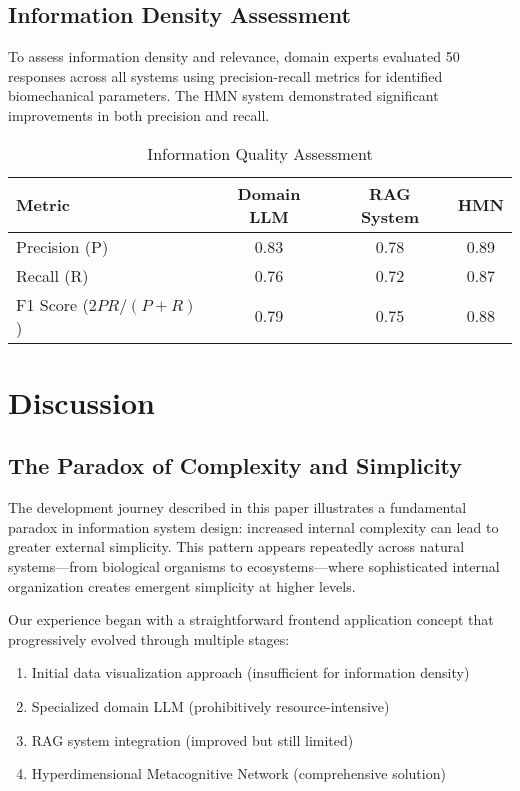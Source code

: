 \documentclass[journal,onecolumn]{IEEEtran}
\begin{document}
\subsection{Information Density Assessment}

To assess information density and relevance, domain experts evaluated 50 responses across all systems using precision-recall metrics for identified biomechanical parameters. The HMN system demonstrated significant improvements in both precision and recall.

\begin{table}[ht]
\centering
\caption{Information Quality Assessment}
\label{tab:info-quality}
\begin{tabular}{lccc}
\toprule
\textbf{Metric} & \textbf{Domain LLM} & \textbf{RAG System} & \textbf{HMN} \\
\midrule
Precision (P) & 0.83 & 0.78 & 0.89 \\
Recall (R) & 0.76 & 0.72 & 0.87 \\
F1 Score ($2PR/(P+R)$) & 0.79 & 0.75 & 0.88 \\
\bottomrule
\end{tabular}
\end{table}

\section{Discussion}

\subsection{The Paradox of Complexity and Simplicity}

The development journey described in this paper illustrates a fundamental paradox in information system design: increased internal complexity can lead to greater external simplicity. This pattern appears repeatedly across natural systems—from biological organisms to ecosystems—where sophisticated internal organization creates emergent simplicity at higher levels.

Our experience began with a straightforward frontend application concept that progressively evolved through multiple stages:

\begin{enumerate}
\item Initial data visualization approach (insufficient for information density)
\item Specialized domain LLM (prohibitively resource-intensive)
\item RAG system integration (improved but still limited)
\item Hyperdimensional Metacognitive Network (comprehensive solution)
\end{enumerate}
\end{document}
